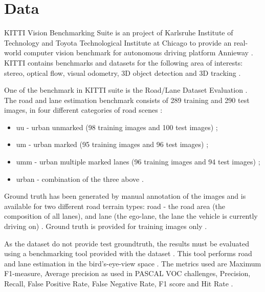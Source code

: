 \documentclass[10pt,twocolumn,letterpaper]{article}
\begin{document}
\section{Data} \label{sec:data}


KITTI Vision Benchmarking Suite is an project of Karlsruhe Institute of Technology and Toyota Technological Institute at Chicago to provide an real-world computer vision benchmark for autonomous driving platform Annieway \cite{KITTI_FULL} \cite{KITTI_WEBSITE}. KITTI contains benchmarks and datasets for the following area of interests: stereo, optical flow, visual odometry, 3D object detection and 3D tracking \cite{KITTI_WEBSITE}.

One of the benchmark in KITTI suite is the Road/Lane Dataset Evaluation \cite{KITTI}. The road and lane estimation benchmark consists of 289 training and 290 test images, in four different categories of road scenes \cite{KITTI}:

\begin{itemize}
 \item uu - urban unmarked (98 training images and 100 test images) \cite{KITTI};
 \item um - urban marked (95 training images and 96 test images) \cite{KITTI};
 \item umm - urban multiple marked lanes (96 training images and 94 test images) \cite{KITTI};
 \item urban - combination of the three above \cite{KITTI}.
\end{itemize}

Ground truth has been generated by manual annotation of the images and is available for two different road terrain types: road - the road area (the composition of all lanes), and lane (the ego-lane, the lane the vehicle is currently driving on) \cite{KITTI} \cite{KITTI_WEBSITE}. Ground truth is provided for training images only \cite{KITTI}. 

As the dataset do not provide test groundtruth, the results must be evaluated using a benchmarking tool provided with the dataset \cite{KITTI_WEBSITE}. This tool  performs road and lane estimation in the bird's-eye-view space \cite{KITTI} \cite{KITTI_WEBSITE}. The metrics used are Maximum F1-measure, Average precision as used in PASCAL VOC challenges, Precision, Recall, False Positive Rate, False Negative Rate, F1 score and Hit Rate \cite{KITTI} \cite{KITTI_WEBSITE}.
\end{document}
